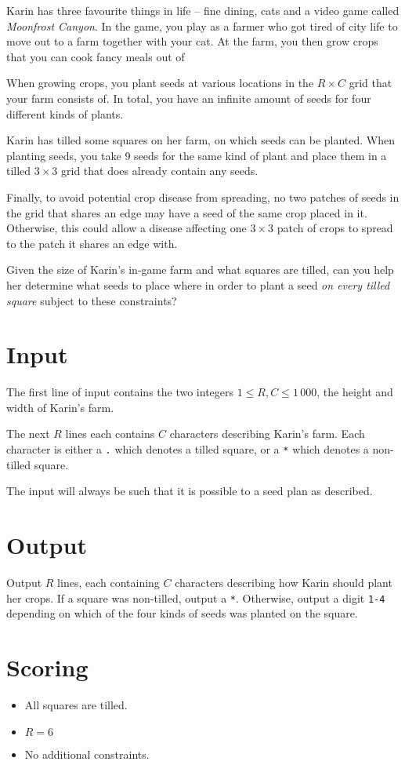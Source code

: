 Karin has three favourite things in life -- fine dining, cats and a video game called \emph{Moonfrost Canyon}.
In the game, you play as a farmer who got tired of city life to move out to a farm together with your cat.
At the farm, you then grow crops that you can cook fancy meals out of

When growing crops, you plant seeds at various locations in the $R \times C$ grid that your farm consists of.
In total, you have an infinite amount of seeds for four different kinds of plants. 

Karin has tilled some squares on her farm, on which seeds can be planted.
When planting seeds, you take 9 seeds for the same kind of plant and place them in a tilled $3 \times 3$ grid that does already contain any seeds.

Finally, to avoid potential crop disease from spreading, no two patches of seeds in the grid that shares an edge may have a seed of the same crop placed in it.
Otherwise, this could allow a disease affecting one $3 \times 3$ patch of crops to spread to the patch it shares an edge with.

Given the size of Karin's in-game farm and what squares are tilled, can you help her determine what seeds to place where in order to plant a seed \emph{on every tilled square} subject to these constraints?

\section*{Input}
The first line of input contains the two integers $1 \le R, C \le 1\,000$, the height and width of Karin's farm.

The next $R$ lines each contains $C$ characters describing Karin's farm.
Each character is either a \texttt{.} which denotes a tilled square, or a \texttt{*} which denotes a non-tilled square.

The input will always be such that it is possible to a seed plan as described.

\section*{Output}
Output $R$ lines, each containing $C$ characters describing how Karin should plant her crops.
If a square was non-tilled, output a \texttt{*}.
Otherwise, output a digit \texttt{1-4} depending on which of the four kinds of seeds was planted on the square.

\section*{Scoring}
\begin{itemize}
  \item All squares are tilled.
  \item $R = 6$
  \item No additional constraints.
\end{itemize}
